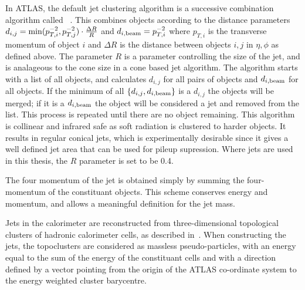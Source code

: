 In ATLAS, the default jet clustering algorithm is a successive combination
algorithm called \antikt~\cite{1126-6708-2008-04-063}. This combines objects
according to the distance parameters $d_{i,j} =
{\rm min}(p_{T,i}^{-2},p_{T,j}^{-2}) \cdot \frac{ \Delta R }{R}$ and $d_{i,\rm{beam}} =
p_{T,i}^{-2}$ where $p_{T,i}$ is the transverse momentum of object $i$ and
$\Delta R$ is the distance between objects $i,j$ in $\eta, \phi$ as defined above.
The parameter $R$ is a parameter controlling the size of the jet, and is
analageous to the cone size in a cone based jet algorithm. The algorithm starts
with a list of all objects, and calculates $d_{i,j}$ for all pairs of objects and
$d_{i,{\rm beam}}$ for all objects. If the minimum of all $\{ d_{i,j}, d_{i,{\rm
beam}} \}$ is a  $d_{i,j}$ the objects will be merged; if it is a $ d_{i,{\rm
beam}}$ the object will be considered a jet and removed from the list. This
process is repeated until there are no object remaining. This algorithm is
collinear and infrared safe as soft radiation is clustered to harder objects. 
It results in regular conical jets, which is experimentally desirable
since it gives a well defined jet area that can be used for pileup supression.
Where jets are used in this thesis, the $R$ parameter is set to be 0.4.

The four momentum of the jet is obtained simply by summing the four-momentum of
the constituant objects. This scheme conserves energy and momentum, and allows a
meaningful definition for the jet mass.

Jets in the calorimeter are reconstructed from three-dimensional topological clusters of hadronic
calorimeter cells, as described in~. When constructing the jets, the
topoclusters are considered as massless pseudo-particles, with an energy equal
to the sum of the energy of the constituant cells and with a direction defined
by a vector pointing from the origin of the ATLAS co-ordinate system to the energy weighted cluster barycentre.


